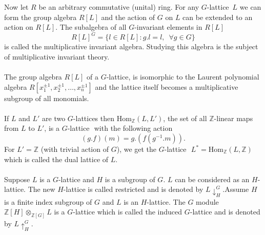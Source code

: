 \documentclass[a4paper, 14pt]{extarticle}
\theoremstyle{plain}
\newtheorem{lemma}[theorem]{Lemma}
\theoremstyle{definition}
\newtheorem{example}[theorem]{Example}
\newcommand{\Z}{\ensuremath{\mathbb{Z}}}
\newcommand{\G}{G}
\newcommand{\glat}{$G$-lattice}
\begin{document}
Now let $R$ be an arbitrary commutative (unital) ring. For any \glat  \, $L$ we can form the group algebra $R[L]$ and the action of $G$ on $L$ can be extended to an action on $R[L]$. The subalgebra of all $G$-invariant elements in $R[L]$ $$ R[L]^ \G = \lbrace l \in R[L] : g.l = l, \,\,\, \forall g \in \G \rbrace$$ is called the multiplicative invariant algebra. Studying this algebra is the subject of multiplicative invariant theory. 
\\
\\
The group algebra $R[L]$ of a \glat , is isomorphic to the Laurent polynomial algebra \linebreak $R[x_1^{\pm 1}, x_2^{\pm 1}, \ldots , x_n^{\pm 1}] $ and the lattice itself becomes a multiplicative subgroup of all monomials.
\\
\\
If $L$ and $L'$ are two \glat  s then $\mathrm{Hom}_{\Z}(L,L')$, the set of all $\Z$-linear maps from $L$ to $L'$, is a \glat \,\, with the following action $$ (g.f)(m) = g.(f(g^{-1}.m)).$$
For $L'=\Z$ (with trivial action of $G$), we get the \glat \,\,  $L^* = \mathrm{Hom}_{\Z}(L,\Z)$ which is called the dual lattice of $L$.\\
\\Suppose $L$ is a $G$-lattice and $H$ is a subgroup of $G$. $L$ can be considered as an $H$-lattice. The new $H$-lattice is called restricted and is denoted by $L\downarrow^G_H$.Assume $H$ is a finite index subgroup of $G$ and $L$ is an $H$-lattice. The $G$ module $\Z[H] \otimes_{\Z[G]} L$ is a $G$-lattice which is called the induced $G$-lattice and is denoted by $L\uparrow_H^G$. 
\end{document}
